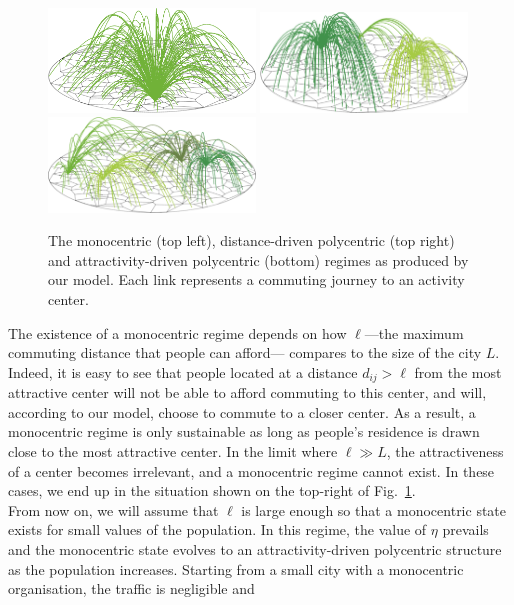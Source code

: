 \begin{figure}
    \centering
    \includegraphics[width=0.49\textwidth]{gfx/chapter-monocentric/1.pdf}
    \includegraphics[width=0.49\textwidth]{gfx/chapter-monocentric/2.pdf}
    \includegraphics[width=0.49\textwidth]{gfx/chapter-monocentric/3.pdf}
    \caption{The monocentric (top left), distance-driven polycentric (top right)
      and attractivity-driven polycentric (bottom) regimes as produced by
      our model. Each link represents a commuting journey to an activity center. \label{fig:model_results}}
\end{figure}

The existence of a monocentric regime depends on how $\ell$---the maximum commuting distance that people can
afford--- compares to the size of the city $L$. Indeed, it is easy to
see that people located at a distance $d_{ij} > \ell$
from the most attractive center will not be able to afford commuting to this
center, and will, according to our model, choose to commute to a closer center.
As a result, a monocentric regime is only sustainable as long as people's
residence is drawn close to the most attractive center. In the limit where $\ell
\gg L$, the attractiveness of a center becomes irrelevant, and a monocentric regime cannot
exist. In these cases, we end up in the situation shown on the top-right of
Fig.~\ref{fig:model_results}.\\


From now on, we will assume that $\ell$ is large enough so that a
monocentric state exists for small values of the population. In this
regime, the value of $\eta$ prevails and the monocentric state evolves
to an attractivity-driven polycentric structure as the population
increases. 
Starting from a small city with a monocentric
organisation, the traffic is negligible and 

